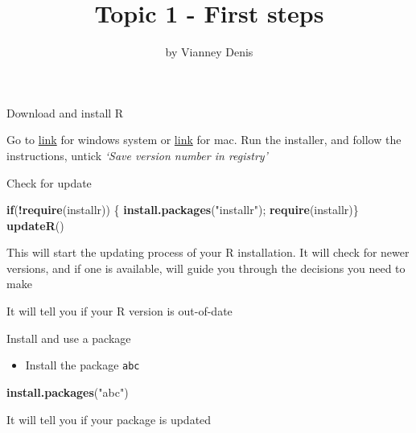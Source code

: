 \documentclass[
  ignorenonframetext,
]{beamer}
\title{Topic 1 - First steps}
\author{by Vianney Denis}
\date{}
\newenvironment{Shaded}{\begin{snugshade}}{\end{snugshade}}
\newcommand{\ControlFlowTok}[1]{\textcolor[rgb]{0.13,0.29,0.53}{\textbf{#1}}}
\newcommand{\KeywordTok}[1]{\textcolor[rgb]{0.13,0.29,0.53}{\textbf{#1}}}
\newcommand{\NormalTok}[1]{#1}
\newcommand{\OperatorTok}[1]{\textcolor[rgb]{0.81,0.36,0.00}{\textbf{#1}}}
\newcommand{\StringTok}[1]{\textcolor[rgb]{0.31,0.60,0.02}{#1}}
\providecommand{\tightlist}{%
  \setlength{\itemsep}{0pt}\setlength{\parskip}{0pt}}
\begin{document}
\frame{\titlepage}

\begin{frame}

\INSTALL

\end{frame}

\begin{frame}[fragile]{Download and install R}
\protect\hypertarget{download-and-install-r}{}

Go to \href{http://cran.r-project.org/bin/windows/base/}{link} for
windows system or \href{https://cran.r-project.org/}{link} for mac. Run
the installer, and follow the instructions, untick \emph{`Save version
number in registry'}

\UPDATE

\begin{block}{Check for update}

\begin{Shaded}
\begin{Highlighting}[]
\ControlFlowTok{if}\NormalTok{(}\OperatorTok{!}\KeywordTok{require}\NormalTok{(installr)) \{}
  \KeywordTok{install.packages}\NormalTok{(}\StringTok{"installr"}\NormalTok{); }\KeywordTok{require}\NormalTok{(installr)\} }
\KeywordTok{updateR}\NormalTok{()}
\end{Highlighting}
\end{Shaded}

This will start the updating process of your R installation. It will
check for newer versions, and if one is available, will guide you
through the decisions you need to make

{ It will tell you if your R version is out-of-date }

\PACKAGE

\end{block}

\begin{block}{Install and use a package}

\begin{itemize}
\tightlist
\item
  Install the package {\texttt{abc}}
\end{itemize}

\begin{Shaded}
\begin{Highlighting}[]
\KeywordTok{install.packages}\NormalTok{(}\StringTok{"abc"}\NormalTok{)}
\end{Highlighting}
\end{Shaded}

{ It will tell you if your package is updated }


\end{block}
\end{frame}
\end{document}
